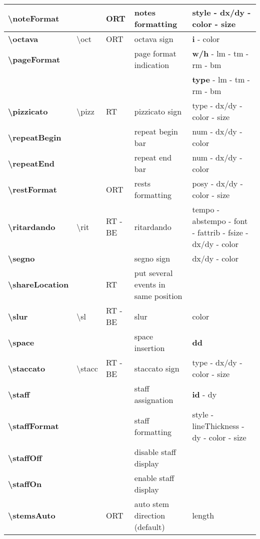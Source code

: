 \documentclass[a4paper, landscape, 10pt]{article}
\begin{document}
\begin{tabularx}{\linewidth}{p{3cm}p{4.5cm}p{3cm}p{5.5cm}l}
    \hline
    \textbf{\textbackslash{}noteFormat}&&ORT&notes formatting&style - dx/dy - color - size\\
    \hline
    \textbf{\textbackslash{}octava}&\textbackslash{}oct&ORT&octava sign&\textbf{i} - color\\
    \hline
    \textbf{\textbackslash{}pageFormat}&&&page format indication&\textbf{w/h} - lm - tm - rm - bm\\
    &&&&\textbf{type} - lm - tm - rm - bm\\
    \hline
    \textbf{\textbackslash{}pizzicato}&\textbackslash{}pizz&RT&pizzicato sign&type - dx/dy - color - size\\
    \hline
    \textbf{\textbackslash{}repeatBegin}&&&repeat begin bar&num - dx/dy - color\\
    \hline
    \textbf{\textbackslash{}repeatEnd}&&&repeat end bar&num - dx/dy - color\\
    \hline
    \textbf{\textbackslash{}restFormat}&&ORT&rests formatting&posy - dx/dy - color - size\\
    \hline
    \textbf{\textbackslash{}ritardando}&\textbackslash{}rit&RT - BE&ritardando&tempo - abstempo - font - fattrib - fsize - dx/dy - color\\
    \hline
    \textbf{\textbackslash{}segno}&&&segno sign&dx/dy - color\\
    \hline
    \textbf{\textbackslash{}shareLocation}&&RT&put several events in same position&\\
    \hline
    \textbf{\textbackslash{}slur}&\textbackslash{}sl&RT - BE&slur&color\\
    \hline
    \textbf{\textbackslash{}space}&&&space insertion&\textbf{dd}\\
    \hline
    \textbf{\textbackslash{}staccato}&\textbackslash{}stacc&RT - BE&staccato sign&type - dx/dy - color - size\\
    \hline
    \textbf{\textbackslash{}staff}&&&staff assignation&\textbf{id} - dy\\
    \hline
    \textbf{\textbackslash{}staffFormat}&&&staff formatting&style - lineThickness - dy - color - size\\
    \hline
    \textbf{\textbackslash{}staffOff}&&&disable staff display&\\
    \hline
    \textbf{\textbackslash{}staffOn}&&&enable staff display&\\
    \hline
    \textbf{\textbackslash{}stemsAuto}&&ORT&auto stem direction (default)&length\\

\end{tabularx}
\end{document}
